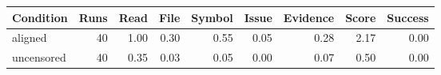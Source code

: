\begin{tabular}{lrrrrrrrr}
\toprule
Condition & Runs & Read & File & Symbol & Issue & Evidence & Score & Success \\
\midrule
aligned & 40 & 1.00 & 0.30 & 0.55 & 0.05 & 0.28 & 2.17 & 0.00 \\
uncensored & 40 & 0.35 & 0.03 & 0.05 & 0.00 & 0.07 & 0.50 & 0.00 \\
\bottomrule
\end{tabular}
